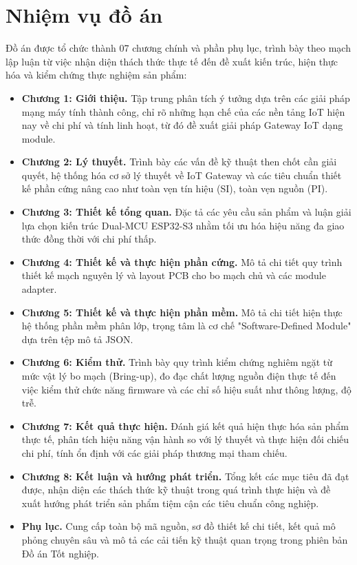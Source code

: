 \section{Nhiệm vụ đồ án}\label{sec:nhiem_vu_do_an}
    Đồ án được tổ chức thành 07 chương chính và phần phụ lục, trình bày theo mạch lập luận từ việc nhận diện thách thức thực tế đến đề xuất kiến trúc, hiện thực hóa và kiểm chứng thực nghiệm sản phẩm:

    \begin{itemize}
        \item \textbf{Chương 1: Giới thiệu.} Tập trung phân tích ý tưởng dựa trên các giải pháp mạng máy tính thành công, chỉ rõ những hạn chế của các nền tảng IoT hiện nay về chi phí và tính linh hoạt, từ đó đề xuất giải pháp Gateway IoT dạng module.

        \item \textbf{Chương 2: Lý thuyết.} Trình bày các vấn đề kỹ thuật then chốt cần giải quyết, hệ thống hóa cơ sở lý thuyết về IoT Gateway và các tiêu chuẩn thiết kế phần cứng nâng cao như toàn vẹn tín hiệu (SI), toàn vẹn nguồn (PI).

        \item \textbf{Chương 3: Thiết kế tổng quan.} Đặc tả các yêu cầu sản phẩm và luận giải lựa chọn kiến trúc Dual-MCU ESP32-S3 nhằm tối ưu hóa hiệu năng đa giao thức đồng thời với chi phí thấp.

        \item \textbf{Chương 4: Thiết kế và thực hiện phần cứng.} Mô tả chi tiết quy trình thiết kế mạch nguyên lý và layout PCB cho bo mạch chủ và các module adapter.

        \item \textbf{Chương 5: Thiết kế và thực hiện phần mềm.} Mô tả chi tiết hiện thực hệ thống phần mềm phân lớp, trọng tâm là cơ chế "Software-Defined Module" dựa trên tệp mô tả JSON.

        \item \textbf{Chương 6: Kiểm thử.} Trình bày quy trình kiểm chứng nghiêm ngặt từ mức vật lý bo mạch (Bring-up), đo đạc chất lượng nguồn điện thực tế đến việc kiểm thử chức năng firmware và các chỉ số hiệu suất như thông lượng, độ trễ.

        \item \textbf{Chương 7: Kết quả thực hiện.} Đánh giá kết quả hiện thực hóa sản phẩm thực tế, phân tích hiệu năng vận hành so với lý thuyết và thực hiện đối chiếu chi phí, tính ổn định với các giải pháp thương mại tham chiếu.

        \item \textbf{Chương 8: Kết luận và hướng phát triển.} Tổng kết các mục tiêu đã đạt được, nhận diện các thách thức kỹ thuật trong quá trình thực hiện và đề xuất hướng phát triển sản phẩm tiệm cận các tiêu chuẩn công nghiệp.

        \item \textbf{Phụ lục.} Cung cấp toàn bộ mã nguồn, sơ đồ thiết kế chi tiết, kết quả mô phỏng chuyên sâu và mô tả các cải tiến kỹ thuật quan trọng trong phiên bản Đồ án Tốt nghiệp.
    \end{itemize}

